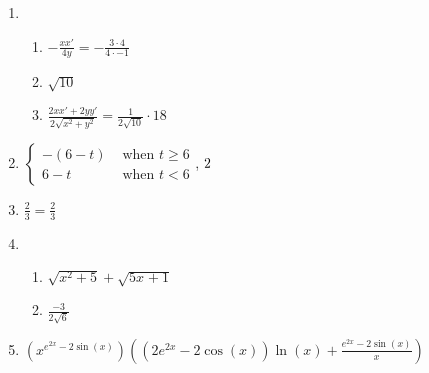 \documentclass[12pt,twoside]{article}
\makeatletter
\def\emptycleardoublepage{\clearpage\if@twoside \ifodd\c@page\else
\thispagestyle{empty}%
\hbox{}\newpage\if@twocolumn\hbox{}\newpage\fi\fi\fi}
\makeatother
\begin{document}
\begin{multicols}{2}
\begin{enumerate}
\def \b{4}\def \x{3}\def \y{-1}\def \xchange{4}\def \ratrhs{-3}\def \cirrhs{13}\def \hyprhs{5}\def \compy{4y^{2}}\def \ychangenum{-4}\def \dist{10}\def \fracrat{\frac{64}{3}}\def \fraccirc{18}\def \frachyp{30}
\item \begin{enumerate}
\item $-\frac{xx'}{\b y} = -\frac{\x \cdot \xchange}{\b \cdot \y}$
\item $\sqrt{\dist}$
\item $\frac{2xx'+2yy'}{2\sqrt{x^2+y^2}} = \frac{1}{2\sqrt{\dist}} \cdot \fraccirc$
\end{enumerate}
\def \a{6}\def \k{2}\def \abstop{0}\def \ktop{1}
\item $\begin{cases} -(\a -t) & \text{ when } t \geq \a \\ \a-t & \text{ when } t < \a \end{cases}$, $\ifthenelse{\ktop=1}{\k}{\frac{1}{\k}}$
\def \a{1}\def \b{-2}\def \k{2}\def \fancyp{x^{2}+x^{}-2}\def \simplep{2x^{}-2}\def \fancyreduced{3}\def \niceanstop{\frac{3}{2}}\def \niceansbottom{\frac{2}{3}}
\item $\frac{\k}{\fancyreduced} = \niceansbottom$
\def \a{1}\def \b{4}\def \ab{4}\def \c{5}\def \amb{-3}\def \ansroot{6}\def \firstroot{x^{2}+5}\def \secondroot{5x^{}+1}\def \porm{-1}
\item \begin{enumerate}
\item $\sqrt{\firstroot} + \sqrt{\secondroot}$
\item $\frac{\amb}{2\sqrt{\ansroot}}$
\end{enumerate}
\def \varexp{2}\def \newexp{1}\def \trigcoeff{-2}\def \trigval{-2}\def \oppval{+2}
\item $(x^{e^{\varexp x} \trigval \sin(x)}) \left( (\varexp e^{\varexp x} \trigval \cos(x))\ln(x) + \frac{e^{\varexp x} \trigval \sin(x)}{x} \right)$
 \end{enumerate}\end{multicols}\emptycleardoublepage{}\graphicspath{{C:/Users/iainc/anaconda3/Randomizer/MATH 1001/Midterm 1/}}\begin{multicols}{2} \begin{enumerate}\def \a{4}\def \b{7}\def \c{-5}\def \d{3}\def \negb{-7}\def \negc{5}\def \determ{47}\def \ansa{\frac{3}{47}}\def \ansb{\frac{-7}{47}}\def \ansc{\frac{5}{47}}\def \ansd{\frac{4}{47}}

\end{enumerate}
\end{multicols}
\end{document}

